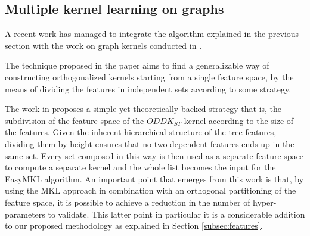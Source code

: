 \subsection{Multiple kernel learning on graphs}
\label{subsec:gmkl}
A recent work \cite{gmkl} has managed to integrate the algorithm explained in the
previous section with the work on graph kernels conducted in \cite{DBLP:conf/sdm/MartinoNS12}.

The technique proposed in the paper aims to find a generalizable way of constructing
orthogonalized kernels starting from a single feature space, by the means of 
dividing the features in independent sets according to some strategy.

The work in \cite{gmkl} proposes a simple yet theoretically backed strategy that is,
the subdivision of the feature space of the $ODDK_{ST}$ kernel according to the
size of the features.
Given the inherent hierarchical structure of the tree features, dividing them by
height ensures that no two dependent features ends up in the same set.
Every set composed in this way is then used as a separate feature space to compute
a separate kernel and the whole list becomes the input for the EasyMKL algorithm.
An important point that emerges from this work is that, by using the MKL approach
in combination with an orthogonal partitioning of the feature space, it is possible
to achieve a reduction in the number of hyper-parameters to validate.
This latter point in particular it is a considerable addition to our proposed
methodology as explained in Section \ref{subsec:features}.


